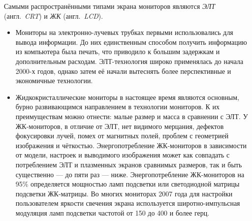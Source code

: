Самыми распространёнными типами экрана мониторов являются \emph{ЭЛТ} (англ.~\emph{CRT}) и \emph{ЖК} (англ.~\emph{LCD}).
\begin{itemize}
 \item Мониторы на электронно-лучевых трубках первыми использовались для вывода информации.
  До них единственным способом получить информацию из компьютера была печать, что приводило к большим задержкам и дополнительным расходам.
  ЭЛТ-технология широко применялась до начала 2000-х годов, однако затем её начали вытеснять более перспективные и экономичные технологии.
 \item Жидкокристаллические мониторы в настоящее время являются основным, бурно развивающимся направлением в технологии мониторов.
  К их преимуществам можно отнести: малые размер и масса в сравнении с ЭЛТ.
  У ЖК-мониторов, в отличие от ЭЛТ, нет видимого мерцания, дефектов фокусировки лучей, помех от магнитных полей, проблем с геометрией изображения и чёткостью.
  Энергопотребление ЖК-мониторов в зависимости от модели, настроек и выводимого изображения может как совпадать с потреблением ЭЛТ и плазменных экранов сравнимых размеров, так и быть существенно --- до пяти раз --- ниже.
  Энергопотребление ЖК-мониторов на 95\% определяется мощностью ламп подсветки или светодиодной матрицы подсветки ЖК-матрицы.
  Во многих мониторах 2007 года для настройки пользователем яркости свечения экрана используется широтно-импульсная модуляция ламп подсветки частотой от 150 до 400 и более герц.
  

\end{itemize}

